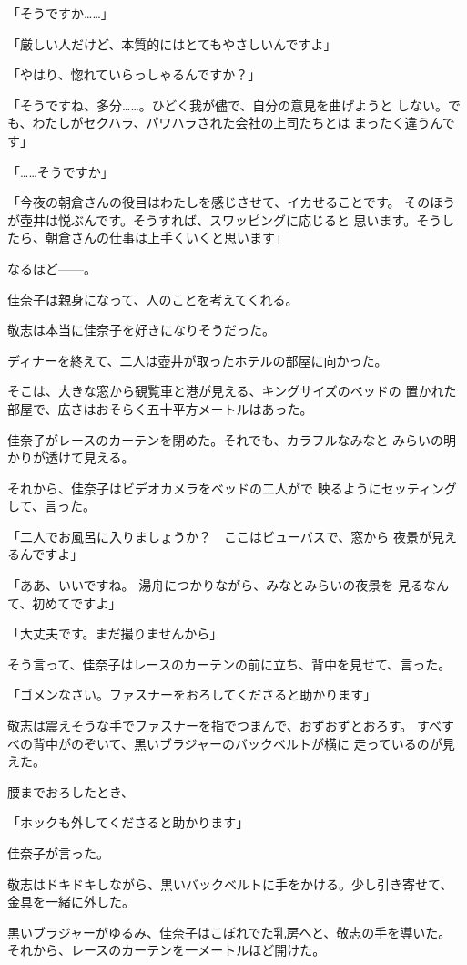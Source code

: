 ﻿\documentclass[
    book,tate,
    line_length=30zw,
    jafontsize=12pt,
    paper=b5j,
    landscape,
    ]{jlreq}
\begin{document}
「そうですか……」

「厳しい人だけど、本質的にはとてもやさしいんですよ」

「やはり、惚れていらっしゃるんですか？」

「そうですね、多分……。ひどく我が儘で、自分の意見を曲げようと
しない。でも、わたしがセクハラ、パワハラされた会社の上司たちとは
まったく違うんです」

「……そうですか」

「今夜の朝倉さんの役目はわたしを感じさせて、イカせることです。
そのほうが壺井は悦ぶんです。そうすれば、スワッピングに応じると
思います。そうしたら、朝倉さんの仕事は上手くいくと思います」

なるほど------。

佳奈子は親身になって、人のことを考えてくれる。

敬志は本当に佳奈子を好きになりそうだった。

ディナーを終えて、二人は壺井が取ったホテルの部屋に向かった。

そこは、大きな窓から観覧車と港が見える、キングサイズのベッドの
置かれた部屋で、広さはおそらく五十平方メートルはあった。

佳奈子がレースのカーテンを閉めた。それでも、カラフルなみなと
みらいの明かりが透けて見える。

それから、佳奈子はビデオカメラをベッドの二人がで
映るようにセッティングして、言った。

「二人でお風呂に入りましょうか？　ここはビューバスで、窓から
夜景が見えるんですよ」

「ああ、いいですね。 湯舟につかりながら、みなとみらいの夜景を
見るなんて、初めてですよ」

「大丈夫です。まだ撮りませんから」

そう言って、佳奈子はレースのカーテンの前に立ち、背中を見せて、言った。

「ゴメンなさい。ファスナーをおろしてくださると助かります」

敬志は震えそうな手でファスナーを指でつまんで、おずおずとおろす。
すべすべの背中がのぞいて、黒いブラジャーのバックベルトが横に
走っているのが見えた。

腰までおろしたとき、

「ホックも外してくださると助かります」

佳奈子が言った。

敬志はドキドキしながら、黒いバックベルトに手をかける。少し引き寄せて、
金具を一緒に外した。

黒いブラジャーがゆるみ、佳奈子はこぼれでた乳房へと、敬志の手を導いた。
それから、レースのカーテンを一メートルほど開けた。
\end{document}
